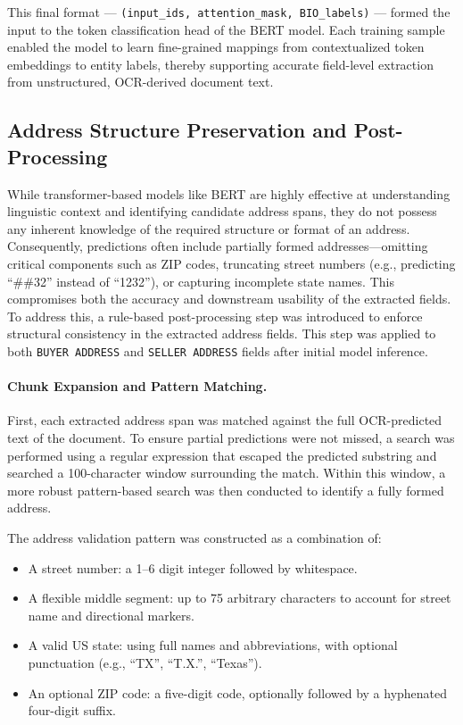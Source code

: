\documentclass{article}
\begin{document}
This final format — \texttt{(input\_ids, attention\_mask, BIO\_labels)} — formed the input to the token classification head of the BERT model. Each training sample enabled the model to learn fine-grained mappings from contextualized token embeddings to entity labels, thereby supporting accurate field-level extraction from unstructured, OCR-derived document text.

\subsection{Address Structure Preservation and Post-Processing}

While transformer-based models like BERT are highly effective at understanding linguistic context and identifying candidate address spans, they do not possess any inherent knowledge of the required structure or format of an address. Consequently, predictions often include partially formed addresses—omitting critical components such as ZIP codes, truncating street numbers (e.g., predicting ``\#\#32'' instead of ``1232''), or capturing incomplete state names. This compromises both the accuracy and downstream usability of the extracted fields. \\

To address this, a rule-based post-processing step was introduced to enforce structural consistency in the extracted address fields. This step was applied to both \texttt{BUYER ADDRESS} and \texttt{SELLER ADDRESS} fields after initial model inference. \\

\paragraph{Chunk Expansion and Pattern Matching.}
First, each extracted address span was matched against the full OCR-predicted text of the document. To ensure partial predictions were not missed, a search was performed using a regular expression that escaped the predicted substring and searched a 100-character window surrounding the match. Within this window, a more robust pattern-based search was then conducted to identify a fully formed address.

The address validation pattern was constructed as a combination of:
\begin{itemize}
    \item A street number: a 1–6 digit integer followed by whitespace.
    \item A flexible middle segment: up to 75 arbitrary characters to account for street name and directional markers.
    \item A valid US state: using full names and abbreviations, with optional punctuation (e.g., ``TX'', ``T.X.'', ``Texas'').
    \item An optional ZIP code: a five-digit code, optionally followed by a hyphenated four-digit suffix.
\end{itemize}
\end{document}
